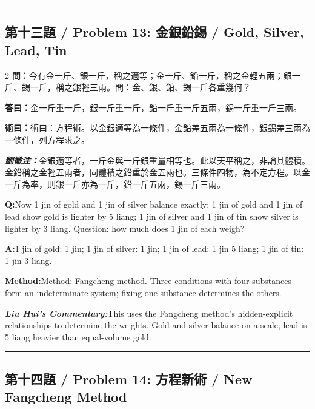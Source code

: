 \documentclass[11pt,a4paper]{article}
\newcommand{\cnwen}{\textcolor{cnlabelfg}{\textbf{問：}}}
\newcommand{\cnda}{\textbf{答曰：}}
\newcommand{\cnshu}{\textcolor{cnlabelfg}{\textbf{術曰：}}}
\newcommand{\cnzhu}{\textcolor{commentarycolor}{\textit{\textbf{劉徽注：}}}}
\newcommand{\enwen}{\textcolor{enlabelfg}{\textbf{Q:}}}
\newcommand{\enda}{\textcolor{enlabelfg}{\textbf{A:}}}
\newcommand{\enshu}{\textcolor{enlabelfg}{\textbf{Method:}}}
\newcommand{\enzhu}{\textcolor{enlabelfg}{\textit{\textbf{Liu Hui's Commentary:}}}}
\begin{document}
\bigskip\hrule\bigskip

\subsection{第十三題 / Problem 13: 金銀鉛錫 / Gold, Silver, Lead, Tin}

\begin{paracol}{2}
\switchcolumn[0]
\cnwen 今有金一斤、銀一斤，稱之適等；金一斤、鉛一斤，稱之金輕五兩；銀一斤、錫一斤，稱之銀輕三兩。問：金、銀、鉛、錫一斤各重幾何？

\cnda 金一斤重一斤，銀一斤重一斤，鉛一斤重一斤五兩，錫一斤重一斤三兩。

\cnshu 術曰：方程術。以金銀適等為一條件，金鉛差五兩為一條件，銀錫差三兩為一條件，列方程求之。

\cnzhu 金銀適等者，一斤金與一斤銀重量相等也。此以天平稱之，非論其體積。金鉛稱之金輕五兩者，同體積之鉛重於金五兩也。三條件四物，為不定方程。以金一斤為率，則銀一斤亦為一斤，鉛一斤五兩，錫一斤三兩。

\switchcolumn[1]
\enwen Now 1 jin of gold and 1 jin of silver balance exactly; 1 jin of gold and 1 jin of lead show gold is lighter by 5 liang; 1 jin of silver and 1 jin of tin show silver is lighter by 3 liang. Question: how much does 1 jin of each weigh?

\enda 1 jin of gold: 1 jin; 1 jin of silver: 1 jin; 1 jin of lead: 1 jin 5 liang; 1 jin of tin: 1 jin 3 liang.

\enshu Method: Fangcheng method. Three conditions with four substances form an indeterminate system; fixing one substance determines the others.

\enzhu This uses the Fangcheng method's hidden-explicit relationships to determine the weights. Gold and silver balance on a scale; lead is 5 liang heavier than equal-volume gold.
\end{paracol}

\bigskip\hrule\bigskip

\subsection{第十四題 / Problem 14: 方程新術 / New Fangcheng Method}
\end{document}
